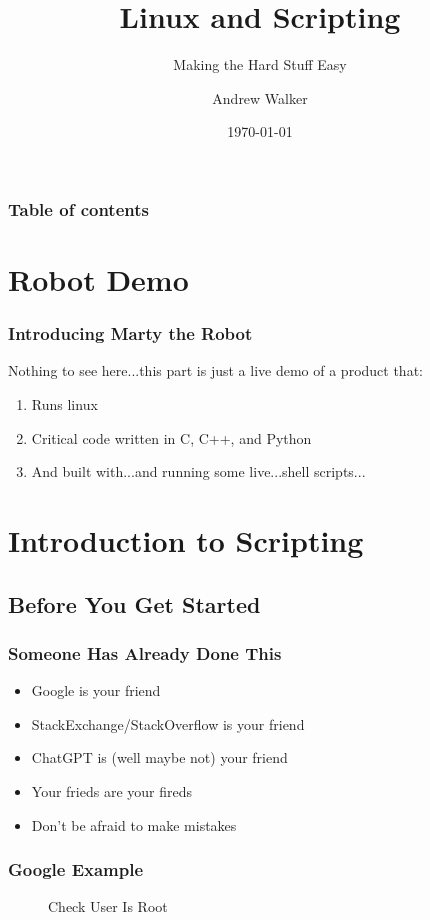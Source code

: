 \documentclass{beamer}
\begin{document}
\title{Linux and Scripting}
\subtitle{Making the Hard Stuff Easy}
\author{Andrew Walker}
\date{\today}
\begin{frame}
  \titlepage
\end{frame}

\begin{frame}\frametitle{Table of contents}\tableofcontents
\end{frame}

\section{Robot Demo}
\begin{frame}\frametitle{Introducing Marty the Robot}
  Nothing to see here...this part is just a live demo of a product that:
  \begin{enumerate}
  \item Runs linux
  \item Critical code written in C, C++, and Python
  \item And built with...and running some live...shell scripts...
  \end{enumerate}
\end{frame}

\section{Introduction to Scripting}
\subsection{Before You Get Started}
\begin{frame}\frametitle{Someone Has Already Done This}
  \begin{itemize}
  \item Google is your friend \pause
  \item StackExchange/StackOverflow is your friend \pause
  \item ChatGPT is (well maybe not) your friend \pause
  \item Your frieds are your fireds \pause
  \item Don't be afraid to make mistakes \pause
  \end{itemize}
\end{frame}

\begin{frame}\frametitle{Google Example}
  \begin{figure}[!htb]
    \linewidth
    \begin{center}
    \end{center}
    \caption{Check User Is Root}\label{fig:google-user-is-root}
  \end{figure}
\end{frame}
\end{document}
